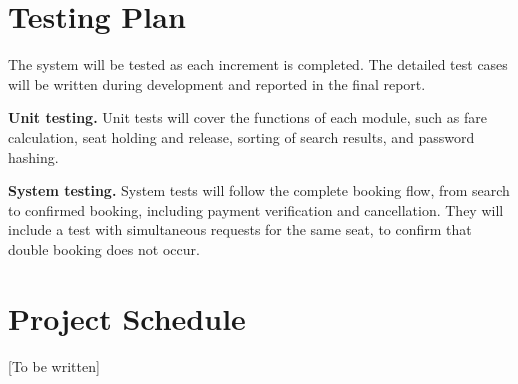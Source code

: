 \section{Testing Plan}

The system will be tested as each increment is completed. The detailed test cases will be written during development and reported in the final report.

\textbf{Unit testing.} Unit tests will cover the functions of each module, such as fare calculation, seat holding and release, sorting of search results, and password hashing.

\textbf{System testing.} System tests will follow the complete booking flow, from search to confirmed booking, including payment verification and cancellation. They will include a test with simultaneous requests for the same seat, to confirm that double booking does not occur.

\section{Project Schedule}
[To be written]
